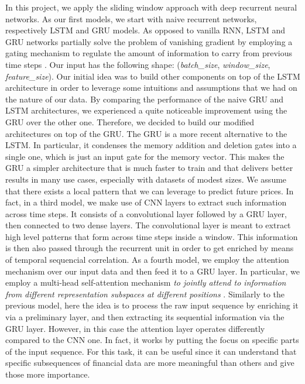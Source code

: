 \documentclass{article}
\begin{document}
In this project, we apply the sliding window approach with deep recurrent neural networks. As our first models, we start with naive recurrent networks, respectively LSTM and GRU models. As opposed to vanilla RNN, LSTM and GRU networks partially solve the problem of vanishing gradient by employing a gating mechanism to regulate the amount of information to carry from previous time steps \cite{vanishing}.
Our input has the following shape: (\emph{batch\_size}, \emph{window\_size}, \emph{feature\_size}).
Our initial idea was to build other components on top of the LSTM architecture in order to leverage some intuitions
and assumptions that we had on the nature of our data. By comparing the performance of the naive GRU and LSTM
architectures, we experienced a quite noticeable improvement using the GRU over the other one. Therefore, we decided
to build our modified architectures on top of the GRU. The GRU is a more recent alternative to the LSTM.
In particular, it condenses the memory addition and deletion gates into a single one, which is just an input gate
for the memory vector. This makes the GRU a simpler architecture that is much faster to train and that delivers
better results in many use cases, especially with datasets of modest sizes.
We assume that there exists a local pattern that we can leverage to predict future prices.
In fact, in a third model, we make use of CNN layers to extract such information across
time steps. It consists of a convolutional layer followed by a GRU layer, then connected
to two dense layers. The convolutional layer is meant to extract high level patterns that
form across time steps inside a window. This information is then also passed through the
recurrent unit in order to get enriched by means of temporal sequencial correlation.
As a fourth model, we employ the attention mechanism over our input
data and then feed it to a GRU layer. In particular, we employ a multi-head
self-attention mechanism \emph{to jointly attend to information from different
representation subspaces at different positions} \cite{46201}. Similarly to the previous
model, here the idea is to process the raw input sequence by enriching it via a preliminary
layer, and then extracting its sequential information via the GRU layer. However, in this
case the attention layer operates differently compared to the CNN one. In fact, it works
by putting the focus on specific parts of the input sequence. For this task, it can be useful
since it can understand that specific subsequences of financial data are more meaningful than
others and give those more importance.    
\end{document}
